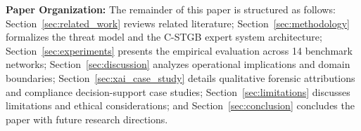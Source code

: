 \textbf{Paper Organization:} The remainder of this paper is structured as follows: Section~\ref{sec:related_work} reviews related literature; Section~\ref{sec:methodology} formalizes the threat model and the C-STGB expert system architecture; Section~\ref{sec:experiments} presents the empirical evaluation across 14 benchmark networks; Section~\ref{sec:discussion} analyzes operational implications and domain boundaries; Section~\ref{sec:xai_case_study} details qualitative forensic attributions and compliance decision-support case studies; Section~\ref{sec:limitations} discusses limitations and ethical considerations; and Section~\ref{sec:conclusion} concludes the paper with future research directions.
